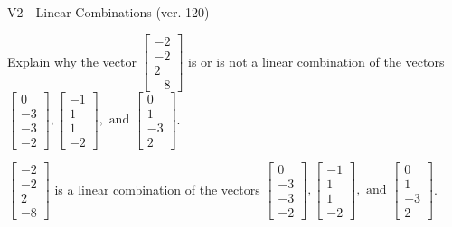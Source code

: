 \begin{exercise}
  \begin{exerciseTitle}V2 - Linear Combinations (ver. 120)\end{exerciseTitle}
  \begin{exerciseStatement}
    Explain why the vector \(\left[\begin{array}{c}
-2 \\
-2 \\
2 \\
-8
\end{array}\right]\)  is or is not a linear 
	combination of the vectors \(\left[\begin{array}{c}
0 \\
-3 \\
-3 \\
-2
\end{array}\right] , \left[\begin{array}{c}
-1 \\
1 \\
1 \\
-2
\end{array}\right] , \text{ and } \left[\begin{array}{c}
0 \\
1 \\
-3 \\
2
\end{array}\right]\).
	


  \end{exerciseStatement}
  \begin{exerciseAnswer}
   \(\left[\begin{array}{c}
-2 \\
-2 \\
2 \\
-8
\end{array}\right]\) 
  	 is  
	a linear combination of the vectors \(\left[\begin{array}{c}
0 \\
-3 \\
-3 \\
-2
\end{array}\right] , \left[\begin{array}{c}
-1 \\
1 \\
1 \\
-2
\end{array}\right] , \text{ and } \left[\begin{array}{c}
0 \\
1 \\
-3 \\
2
\end{array}\right]\).

	
  


  \end{exerciseAnswer}
\end{exercise}